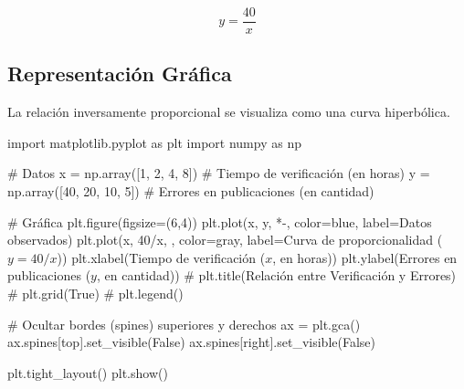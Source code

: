 \documentclass[
  stu,
  floatsintext,
  longtable,
  a4paper,
  nolmodern,
  notxfonts,
  notimes,
  12pt,
  colorlinks=true,linkcolor=blue,citecolor=blue,urlcolor=blue]{apa7}
\newenvironment{Shaded}{\begin{snugshade}}{\end{snugshade}}
\newcommand{\CommentTok}[1]{\textcolor[rgb]{0.37,0.37,0.37}{#1}}
\newcommand{\DecValTok}[1]{\textcolor[rgb]{0.68,0.00,0.00}{#1}}
\newcommand{\ImportTok}[1]{\textcolor[rgb]{0.00,0.46,0.62}{#1}}
\newcommand{\NormalTok}[1]{\textcolor[rgb]{0.00,0.23,0.31}{#1}}
\newcommand{\OperatorTok}[1]{\textcolor[rgb]{0.37,0.37,0.37}{#1}}
\newcommand{\StringTok}[1]{\textcolor[rgb]{0.13,0.47,0.30}{#1}}
\newcommand{\VariableTok}[1]{\textcolor[rgb]{0.07,0.07,0.07}{#1}}
\begin{document}
\[
y = \frac{40}{x}
\]

\subsection{Representación
Gráfica}\label{representaciuxf3n-gruxe1fica-1}

La relación inversamente proporcional se visualiza como una curva
hiperbólica.

\begin{Shaded}
\begin{Highlighting}[]
\ImportTok{import}\NormalTok{ matplotlib.pyplot }\ImportTok{as}\NormalTok{ plt}
\ImportTok{import}\NormalTok{ numpy }\ImportTok{as}\NormalTok{ np}

\CommentTok{\# Datos}
\NormalTok{x }\OperatorTok{=}\NormalTok{ np.array([}\DecValTok{1}\NormalTok{, }\DecValTok{2}\NormalTok{, }\DecValTok{4}\NormalTok{, }\DecValTok{8}\NormalTok{])  }\CommentTok{\# Tiempo de verificación (en horas)}
\NormalTok{y }\OperatorTok{=}\NormalTok{ np.array([}\DecValTok{40}\NormalTok{, }\DecValTok{20}\NormalTok{, }\DecValTok{10}\NormalTok{, }\DecValTok{5}\NormalTok{])  }\CommentTok{\# Errores en publicaciones (en cantidad)}

\CommentTok{\# Gráfica}
\NormalTok{plt.figure(figsize}\OperatorTok{=}\NormalTok{(}\DecValTok{6}\NormalTok{,}\DecValTok{4}\NormalTok{))}
\NormalTok{plt.plot(x, y, }\StringTok{\textquotesingle{}*{-}\textquotesingle{}}\NormalTok{, color}\OperatorTok{=}\StringTok{\textquotesingle{}blue\textquotesingle{}}\NormalTok{, label}\OperatorTok{=}\StringTok{\textquotesingle{}Datos observados\textquotesingle{}}\NormalTok{)}
\NormalTok{plt.plot(x, }\DecValTok{40}\OperatorTok{/}\NormalTok{x, }\StringTok{\textquotesingle{}{-}{-}\textquotesingle{}}\NormalTok{, color}\OperatorTok{=}\StringTok{\textquotesingle{}gray\textquotesingle{}}\NormalTok{, label}\OperatorTok{=}\StringTok{\textquotesingle{}Curva de proporcionalidad ($y = 40/x$)\textquotesingle{}}\NormalTok{)}
\NormalTok{plt.xlabel(}\StringTok{\textquotesingle{}Tiempo de verificación ($x$, en horas)\textquotesingle{}}\NormalTok{)}
\NormalTok{plt.ylabel(}\StringTok{\textquotesingle{}Errores en publicaciones ($y$, en cantidad)\textquotesingle{}}\NormalTok{)}
\CommentTok{\# plt.title(\textquotesingle{}Relación entre Verificación y Errores\textquotesingle{})}
\CommentTok{\# plt.grid(True)}
\CommentTok{\# plt.legend()}

\CommentTok{\# Ocultar bordes (spines) superiores y derechos}
\NormalTok{ax }\OperatorTok{=}\NormalTok{ plt.gca()}
\NormalTok{ax.spines[}\StringTok{\textquotesingle{}top\textquotesingle{}}\NormalTok{].set\_visible(}\VariableTok{False}\NormalTok{)}
\NormalTok{ax.spines[}\StringTok{\textquotesingle{}right\textquotesingle{}}\NormalTok{].set\_visible(}\VariableTok{False}\NormalTok{)}

\NormalTok{plt.tight\_layout()}
\NormalTok{plt.show()}
\end{Highlighting}
\end{Shaded}
\end{document}
